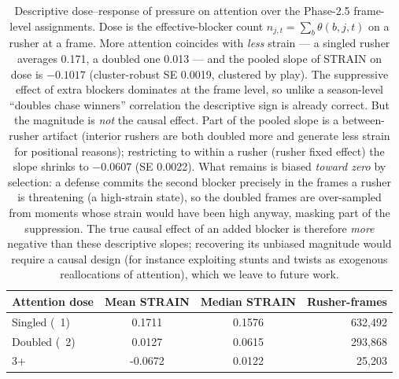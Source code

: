 \begin{table}[h!]
\centering
\footnotesize
\begin{tabular}{lccr}
\toprule
Attention dose & Mean STRAIN & Median STRAIN & Rusher-frames \\
\midrule
Singled (~1) & 0.1711 & 0.1576 & 632,492 \\
Doubled (~2) & 0.0127 & 0.0615 & 293,868 \\
3+ & -0.0672 & 0.0122 & 25,203 \\
\bottomrule
\end{tabular}
\caption{Descriptive dose--response of pressure on attention over the Phase-2.5 frame-level
assignments. Dose is the effective-blocker count $n_{j,t}=\sum_b\theta(b,j,t)$ on a rusher at a
frame. More attention coincides with \emph{less} strain --- a singled rusher averages
0.171, a doubled one 0.013 --- and the pooled slope of
STRAIN on dose is $-0.1017$ (cluster-robust SE 0.0019, clustered by
play). The suppressive effect of extra blockers dominates at the frame level, so unlike a season-level
``doubles chase winners'' correlation the descriptive sign is already correct. But the magnitude is
\emph{not} the causal effect. Part of the pooled slope is a between-rusher artifact (interior
rushers are both doubled more and generate less strain for positional reasons); restricting to within
a rusher (rusher fixed effect) the slope shrinks to $-0.0607$ (SE 0.0022).
What remains is biased \emph{toward zero} by selection: a defense commits the second blocker
precisely in the frames a rusher is threatening (a high-strain state), so the doubled frames are
over-sampled from moments whose strain would have been high anyway, masking part of the suppression.
The true causal effect of an added blocker is therefore \emph{more} negative than these descriptive
slopes; recovering its unbiased magnitude would require a causal design (for instance exploiting
stunts and twists as exogenous reallocations of attention), which we leave to future work.}
\label{tab:dose_response}
\end{table}
